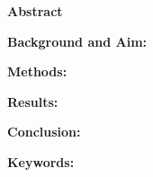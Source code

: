 \ChapterStart
\begin{latin}
\begin{center}
  {\bfseries\fontsize{14pt}{17pt}\selectfont \ThesisTitleEN\par}
  \vspace{1em}
  {\bfseries\fontsize{14pt}{17pt}\selectfont Abstract}
\end{center}
\vspace{0.8em}
\noindent\textbf{Background and Aim:}


\vspace{0.45em}
\noindent\textbf{Methods:}


\vspace{0.45em}
\noindent\textbf{Results:}


\vspace{0.45em}
\noindent\textbf{Conclusion:}


\vspace{0.8em}
\noindent\textbf{Keywords:} \KeywordsEN
\end{latin}
\clearpage
